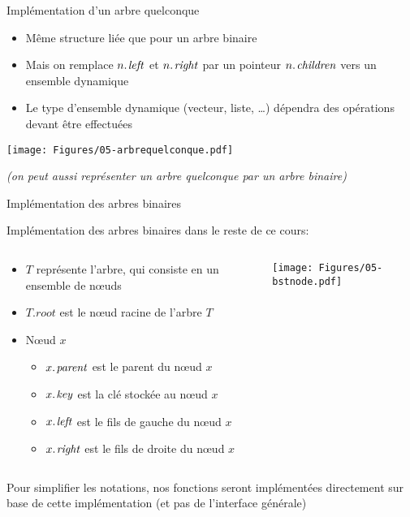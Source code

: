 \begin{frame}{Implémentation d'un arbre quelconque}

\begin{itemize}
\item Même structure liée que pour un arbre binaire
\item Mais on remplace $\attrib{n}{left}$ et $\attrib{n}{right}$ par un pointeur $\attrib{n}{children}$ vers un ensemble dynamique
\item Le type d'ensemble dynamique (vecteur, liste, \ldots) dépendra des opérations devant être effectuées
\end{itemize}

\centerline{\texttt{[image: Figures/05-arbrequelconque.pdf]}}

{\it (on peut aussi représenter un arbre quelconque par un arbre binaire)}
\end{frame}

\begin{frame}{Implémentation des arbres binaires}

Implémentation des arbres binaires dans le reste de ce cours:
\begin{columns}
\begin{column}{7.5cm}
\begin{itemize}
\item $T$ représente l'arbre, qui consiste en un ensemble de n\oe uds
\item $T.root$ est le n\oe ud racine de l'arbre $T$
\item N\oe ud $x$
\begin{itemize}
\item $\attrib{x}{parent}$ est le parent du n\oe ud $x$
\item $\attrib{x}{key}$ est la clé stockée au n\oe ud $x$
\item $\attrib{x}{left}$ est le fils de  gauche du n\oe ud $x$
\item $\attrib{x}{right}$ est le fils de droite du n\oe ud $x$
\end{itemize}
\end{itemize}
\end{column}
\begin{column}{4cm}
\begin{center}
\texttt{[image: Figures/05-bstnode.pdf]}
\end{center}
\end{column}
\end{columns}

\bigskip
Pour simplifier les notations, nos fonctions seront implémentées directement sur base de cette implémentation (et pas de l'interface générale)


\end{frame}

